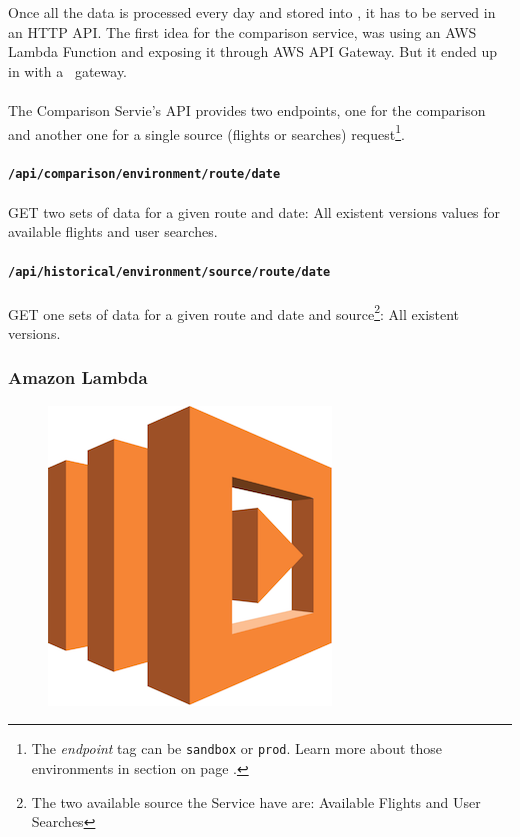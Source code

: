 Once all the data is processed every day and stored into , it has to be served in an HTTP\cite{http} API. The first idea for the comparison service, was using an AWS Lambda Function and exposing it through AWS API Gateway. But it ended up in  with a \company\ gateway.
\\\\
The Comparison Servie's API provides two endpoints, one for the comparison and another one for a single source (flights or searches) request\footnote{The \textit{endpoint} tag can be \texttt{sandbox} or \texttt{prod}. Learn more about those environments in section  on page \pageref{environments}.}. 
\\\\
\textbf{\texttt{/api/comparison/{environment}/{route}/{date}}}
\\\\
GET two sets of data for a given route and date: All existent versions values for available flights and user searches.
\\\\
\textbf{\texttt{/api/historical/{environment}/{source}/{route}/{date}}}
\\\\
GET one sets of data for a given route and date and source\footnote{The two available source the Service have are: Available Flights and User Searches}: All existent versions.

\subsubsection{Amazon Lambda} \label{lambda}

\begin{figure}[H]
\includegraphics[scale=0.1]{resources/lambda-logo.png}
\end{figure}

